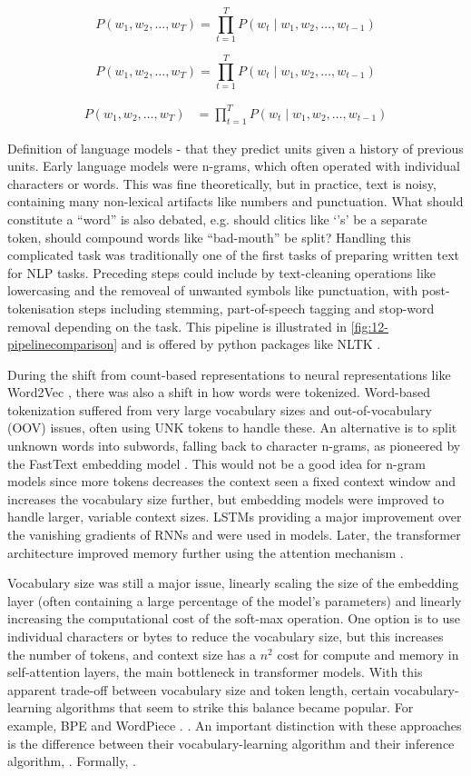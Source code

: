 \[
P(w_1, w_2, \dots, w_T) = \prod_{t=1}^{T} P(w_t \mid w_1, w_2, \dots, w_{t - 1})
\]

\[
P(w_1, w_2, \dots, w_T) = \prod_{t=1}^{T} P\left(w_t \mid w_1, w_2, \dots, w_{t-1}\right)
\]

\begin{align}
    P(w_1, w_2, \dots, w_T) &= \prod_{t=1}^{T} P\left(w_t \mid w_1, w_2, \dots, w_{t-1}\right)
\end{align}


Definition of language models - that they predict units given a history of previous units. Early language models were n-grams, which often operated with individual characters or words. This was fine theoretically, but in practice, text is noisy, containing many non-lexical artifacts like numbers and punctuation. What should constitute a ``word'' is also debated, e.g. should clitics like `'s' be a separate token, should compound words like ``bad-mouth'' be split? Handling this complicated task was traditionally one of the first tasks of preparing written text for NLP tasks. Preceding steps could include by text-cleaning operations like lowercasing and the removeal of unwanted symbols like punctuation, with post-tokenisation steps including stemming, part-of-speech tagging and stop-word removal depending on the task. This pipeline is illustrated in \cref{fig:12-pipelinecomparison} and is offered by python packages like NLTK \addcites.

During the shift from count-based representations to neural representations like Word2Vec \addcites, there was also a shift in how words were tokenized. Word-based tokenization suffered from very large vocabulary sizes and out-of-vocabulary (OOV) issues, often using UNK tokens to handle these. An alternative is to split unknown words into subwords, falling back to character n-grams, as pioneered by the FastText embedding model \addcites. This would not be a good idea for n-gram models since more tokens decreases the context seen a fixed context window and increases the vocabulary size further, but embedding models were improved to handle larger, variable context sizes. LSTMs providing a major improvement over the vanishing gradients of RNNs and were used in \writemore models. Later, the transformer architecture improved memory further using the attention mechanism \addcites.

Vocabulary size was still a major issue, linearly scaling the size of the embedding layer (often containing a large percentage of the model's parameters) and linearly increasing the computational cost of the soft-max operation. One option is to use individual characters or bytes to reduce the vocabulary size, but this increases the number of tokens, and context size has a $n^2$ cost for compute and memory in self-attention layers, the main bottleneck in transformer models. With this apparent trade-off between vocabulary size and token length, certain vocabulary-learning algorithms that seem to strike this balance became popular. For example, BPE and WordPiece \addcites. \writemore. An important distinction with these approaches is the difference between their vocabulary-learning algorithm and their inference algorithm, \writemore. Formally, \writemore. 

